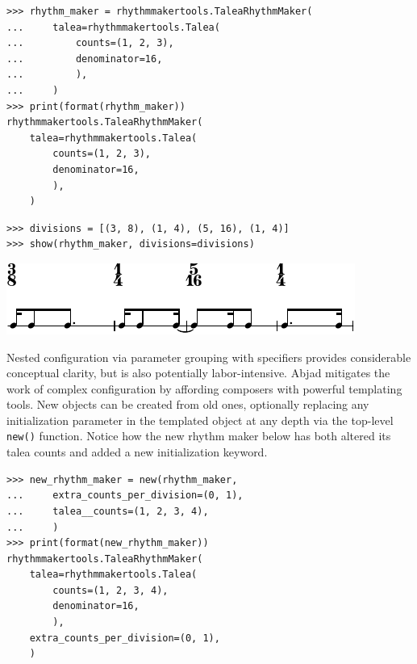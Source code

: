 \documentclass{article}
\begin{document}
\begin{lstlisting}
>>> rhythm_maker = rhythmmakertools.TaleaRhythmMaker(
...     talea=rhythmmakertools.Talea(
...         counts=(1, 2, 3),
...         denominator=16,
...         ),
...     )
>>> print(format(rhythm_maker))
rhythmmakertools.TaleaRhythmMaker(
    talea=rhythmmakertools.Talea(
        counts=(1, 2, 3),
        denominator=16,
        ),
    )
\end{lstlisting}

\begin{lstlisting}
>>> divisions = [(3, 8), (1, 4), (5, 16), (1, 4)]
>>> show(rhythm_maker, divisions=divisions)
\end{lstlisting}
\includegraphics{assets/lilypond-8d11397fa8a7ed768182e6c89abe52f0.pdf}

Nested configuration via parameter grouping with specifiers provides
considerable conceptual clarity, but is also potentially labor-intensive. Abjad
mitigates the work of complex configuration by affording composers with
powerful templating tools. New objects can be created from old ones, optionally
replacing any initialization parameter in the templated object at any depth via
the top-level \texttt{new()} function. Notice how the new rhythm maker below
has both altered its talea counts and added a new initialization keyword.

\begin{lstlisting}
>>> new_rhythm_maker = new(rhythm_maker,
...     extra_counts_per_division=(0, 1),
...     talea__counts=(1, 2, 3, 4),
...     )
>>> print(format(new_rhythm_maker))
rhythmmakertools.TaleaRhythmMaker(
    talea=rhythmmakertools.Talea(
        counts=(1, 2, 3, 4),
        denominator=16,
        ),
    extra_counts_per_division=(0, 1),
    )
\end{lstlisting}
\end{document}
